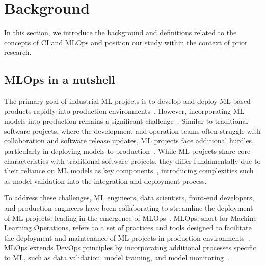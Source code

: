 \section{Background}
\label{sec:related_work}

In this section, we introduce the background and definitions related to the concepts of CI and MLOps and position our study within the context of prior research.

\subsection{MLOps in a nutshell}

The primary goal of industrial ML projects is to develop and deploy ML-based products rapidly into production environments~\citep{kreuzberger2023machine}. 
However, incorporating ML models into production remains a significant challenge~\citep{symeonidis2022mlops}. 
Similar to traditional software projects, where the development and operation teams often struggle with collaboration and software release updates, ML projects face additional hurdles, particularly in deploying models to production~\citep{symeonidis2022mlops}.
While ML projects share core characteristics with traditional software projects, they differ fundamentally due to their reliance on ML models as key components~\citep{gift2021practical}, introducing complexities such as model validation into the integration and deployment process.

To address these challenges, ML engineers, data scientists, front-end developers, and production engineers have been collaborating to streamline the deployment of ML projects, leading in the emergence of MLOps~\citep{symeonidis2022mlops}.
MLOps, short for Machine Learning Operations, refers to a set of practices and tools designed to facilitate the deployment and maintenance of ML projects in production environments~\citep{makinen2021needs}. 
MLOps extends DevOps principles by incorporating additional processes specific to ML, such as data validation, model training, and model monitoring~\citep{symeonidis2022mlops, makinen2021needs, calefato2022preliminary}.

